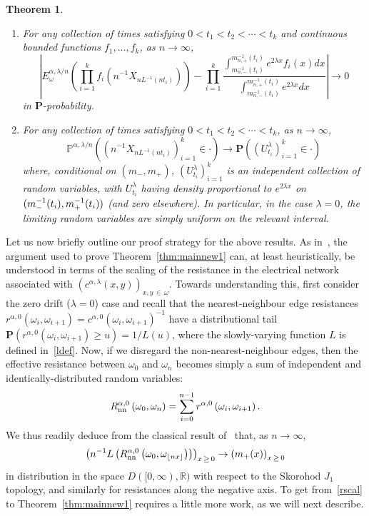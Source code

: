 \documentclass[10pt]{amsart}
\newtheorem{theo}{Theorem}[section]
\theoremstyle{definition}\newtheorem{defi}[theo]{Definition}\newtheorem{rema}[theo]{Remark}\newtheorem{exam}[theo]{Example}\newtheorem{exem}[theo]{Example}\newtheorem{nota}[theo]{Notation}
\newcommand{\R}{\mathbb R}
\renewcommand{\P}{\mathbb P}
\newcommand{\bfP}{\mathbf{P}}
\newcommand*{\alphenumi}{\renewcommand*{\theenumi}{\alph{enumi}}}
\begin{document}
\begin{theo}\label{thm:mainnew3}\leavevmode
\begin{enumerate}\alphenumi
\item\label{theo1.4.a} For any collection of times satisfying $0<t_1<t_2<\cdots<t_k$ and continuous bounded functions $f_1,\dots,f_k$, as $n\rightarrow\infty$,
\[
\left|E^{\alpha,\lambda/n}_\omega\left(\prod_{i=1}^kf_i\left(n^{-1}{X}_{nL^{-1}(nt_i)}\right)\right)-\prod_{i=1}^k\frac{\int_{m_{n,-}^{-1}(t_i)}^{m_{n,+}^{-1}(t_i)}e^{2\lambda x}f_i(x)dx}{\int_{m_{n,-}^{-1}(t_i)}^{m_{n,+}^{-1}(t_i)}e^{2\lambda x}dx}\right|
\rightarrow0
\]
in $\bfP$-probability.
\item\label{theo1.4.b} For any collection of times satisfying $0<t_1<t_2<\cdots<t_k$, as $n\rightarrow\infty$,
\[
\P^{\alpha,\lambda/n}\left(\left(n^{-1}{X}_{nL^{-1}(nt_i)}\right)_{i=1}^k\in \cdot\right)\rightarrow \bfP\left(\left(U^\lambda_{t_i}\right)_{i=1}^k\in\cdot\right)
\]
where, conditional on $(m_-,m_+)$, $(U^\lambda_{t_i})_{i=1}^k$ is an independent collection of random variables, with $U^\lambda_{t_i}$ having density proportional to $e^{2\lambda x}$ on $(m_-^{-1}(t_i),m_+^{-1}\linebreak(t_i))$ (and zero elsewhere). In particular, in the case $\lambda=0$, the limiting random variables are simply uniform on the relevant interval.
\end{enumerate}
\end{theo}

Let us now briefly outline our proof strategy for the above results. As in~\cite{CFJ}, the argument used to prove Theorem~\ref{thm:mainnew1} can, at least heuristically, be understood in terms of the scaling of the resistance in the electrical network associated with $(c^{\alpha,\lambda}(x,y))_{x,y\,\in\,\omega}$. Towards understanding this, first consider the zero drift ($\lambda=0$) case and recall that the nearest-neighbour edge resistances $r^{\alpha,0}(\omega_i,\omega_{i+1})=c^{\alpha,0}(\omega_i,\omega_{i+1})^{-1}$ have a distributional tail $\bfP(r^{\alpha,0}(\omega_i,\omega_{i+1})\geq u)=1/L(u)$, where the slowly-varying function $L$ is defined in~\eqref{ldef}. Now, if we disregard the non-nearest-neighbour edges, then the effective resistance between $\omega_0$ and $\omega_n$ becomes simply a sum of independent and identically-distributed random variables:
\[
R^{\alpha,0}_{\text{\upshape{nn}}}\left(\omega_0,\omega_n\right)=\sum_{i=0}^{n-1}r^{\alpha,0}\left(\omega_{i},\omega_{i+1}\right).
\]
We thus readily deduce from the classical result of~\cite[Theorem~2.1]{Kasa} that, as $n\to\infty$,
\begin{equation}\label{rscal}
\left(n^{-1}L\left(R^{\alpha,0}_{\text{\upshape{nn}}}\left(\omega_0,\omega_{\lfloor nx\rfloor}\right)\right)\right)_{x\,\geq\,0}\rightarrow \left(m_+(x)\right)_{x\,\geq\,0}
\end{equation}
in distribution in the space $D([0,\infty),\R)$ with respect to the Skorohod $J_1$ topology, and similarly for resistances along the negative axis. To get from~\eqref{rscal} to Theorem~\ref{thm:mainnew1} requires a little more work, as we will next describe.
\end{document}
